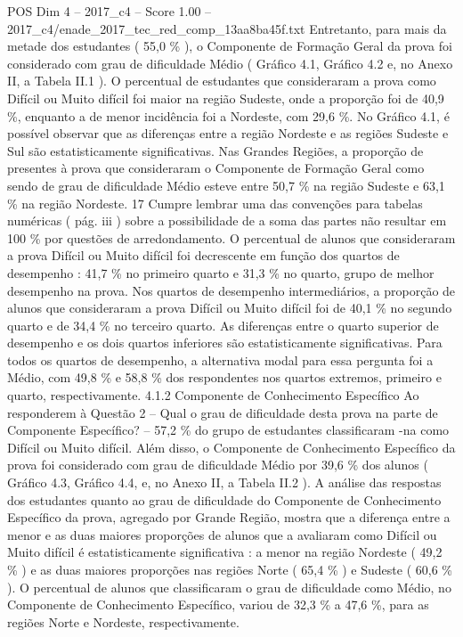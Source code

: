 \begin{textsample}{POS Dim 4 – 2017\_c4 – Score 1.00 – 2017\_c4/enade\_2017\_tec\_red\_comp\_13aa8ba45f.txt}
Entretanto, para mais da metade dos estudantes ( 55,0 \% ), o Componente de Formação Geral da prova foi considerado com grau de dificuldade Médio ( Gráfico 4.1, Gráfico 4.2 e, no Anexo II, a Tabela II.1 ).
O percentual de estudantes que consideraram a prova como Difícil ou Muito difícil foi maior na região Sudeste, onde a proporção foi de 40,9 \%, enquanto a de menor incidência foi a Nordeste, com 29,6 \%.
No Gráfico 4.1, é possível observar que as diferenças entre a região Nordeste e as regiões Sudeste e Sul são estatisticamente significativas.
Nas Grandes Regiões, a proporção de presentes à prova que consideraram o Componente de Formação Geral como sendo de grau de dificuldade Médio esteve entre 50,7 \% na região Sudeste e 63,1 \% na região Nordeste. 17 Cumpre lembrar uma das convenções para tabelas numéricas ( pág. iii ) sobre a possibilidade de a soma das partes não resultar em 100 \% por questões de arredondamento.
O percentual de alunos que consideraram a prova Difícil ou Muito difícil foi decrescente em função dos quartos de desempenho : 41,7 \% no primeiro quarto e 31,3 \% no quarto, grupo de melhor desempenho na prova.
Nos quartos de desempenho intermediários, a proporção de alunos que consideraram a prova Difícil ou Muito difícil foi de 40,1 \% no segundo quarto e de 34,4 \% no terceiro quarto.
As diferenças entre o quarto superior de desempenho e os dois quartos inferiores são estatisticamente significativas.
Para todos os quartos de desempenho, a alternativa modal para essa pergunta foi a Médio, com 49,8 \% e 58,8 \% dos respondentes nos quartos extremos, primeiro e quarto, respectivamente. 4.1.2 Componente de Conhecimento Específico Ao responderem à Questão 2 – Qual o grau de dificuldade desta prova na parte de Componente Específico? – 57,2 \% do grupo de estudantes classificaram -na como Difícil ou Muito difícil.
Além disso, o Componente de Conhecimento Específico da prova foi considerado com grau de dificuldade Médio por 39,6 \% dos alunos ( Gráfico 4.3, Gráfico 4.4, e, no Anexo II, a Tabela II.2 ).
A análise das respostas dos estudantes quanto ao grau de dificuldade do Componente de Conhecimento Específico da prova, agregado por Grande Região, mostra que a diferença entre a menor e as duas maiores proporções de alunos que a avaliaram como Difícil ou Muito difícil é estatisticamente significativa : a menor na região Nordeste ( 49,2 \% ) e as duas maiores proporções nas regiões Norte ( 65,4 \% ) e Sudeste ( 60,6 \% ).
O percentual de alunos que classificaram o grau de dificuldade como Médio, no Componente de Conhecimento Específico, variou de 32,3 \% a 47,6 \%, para as regiões Norte e Nordeste, respectivamente.

\end{textsample}
